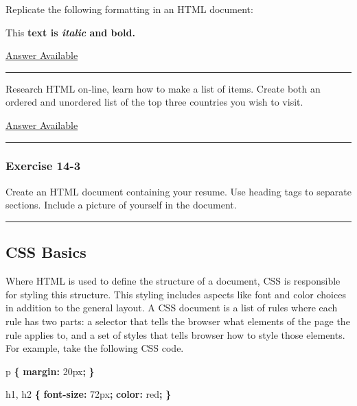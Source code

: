 \documentclass[]{memoir}
\newenvironment{Shaded}{}{}
\newcommand{\KeywordTok}[1]{\textcolor[rgb]{0.00,0.44,0.13}{\textbf{{#1}}}}
\newcommand{\DataTypeTok}[1]{\textcolor[rgb]{0.56,0.13,0.00}{{#1}}}
\newcommand{\NormalTok}[1]{{#1}}
\begin{document}
Replicate the following formatting in an HTML document:

This \textbf{text is \emph{italic} and bold.}

\hyperref[Ans-14-1]{Answer Available}

\begin{center}\rule{3in}{0.4pt}\end{center}


Research HTML on-line, learn how to make a list of items. Create both an
ordered and unordered list of the top three countries you wish to visit.

\hyperref[Ans-14-2]{Answer Available}

\begin{center}\rule{3in}{0.4pt}\end{center}

\subsubsection{Exercise 14-3}

Create an HTML document containing your resume. Use heading tags to
separate sections. Include a picture of yourself in the document.

\begin{center}\rule{3in}{0.4pt}\end{center}

\subsection{CSS Basics}

Where HTML is used to define the structure of a document, CSS is
responsible for styling this structure. This styling includes aspects
like font and color choices in addition to the general layout. A CSS
document is a list of rules where each rule has two parts: a selector
that tells the browser what elements of the page the rule applies to,
and a set of styles that tells browser how to style those elements. For
example, take the following CSS code.

\begin{Shaded}
\begin{Highlighting}[]
\NormalTok{p }\KeywordTok{\{}
    \KeywordTok{margin:} \DataTypeTok{20px}\KeywordTok{;}
\KeywordTok{\}}

\NormalTok{h1, h2 }\KeywordTok{\{}
    \KeywordTok{font-size:} \DataTypeTok{72px}\KeywordTok{;}
    \KeywordTok{color:} \DataTypeTok{red}\KeywordTok{;}
\KeywordTok{\}}
\end{Highlighting}
\end{Shaded}
\end{document}
